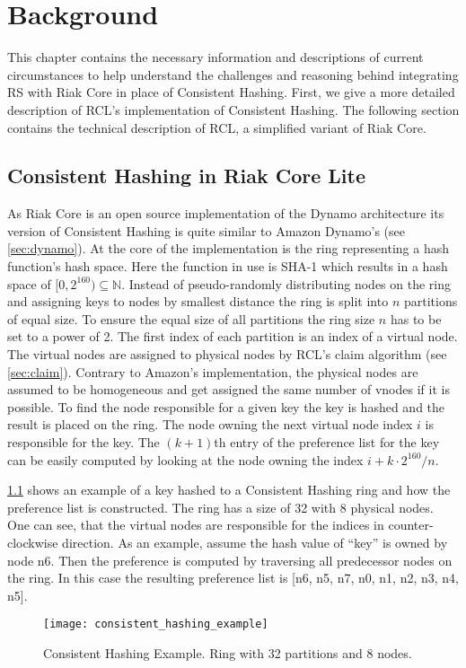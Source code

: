 \chapter{Background}
\label{ch:background}
This chapter contains the necessary information and descriptions of current circumstances to help understand the challenges and reasoning  behind integrating \ac{RS} with Riak Core in place of Consistent Hashing.
First, we give a more detailed description of \ac{RCL}'s implementation of Consistent Hashing.
The following section contains the technical description of \ac{RCL}, a simplified variant of Riak Core.

\section{Consistent Hashing in Riak Core Lite}
\label{sec:riak_core_consistent_hashing}
As Riak Core is an open source implementation of the Dynamo architecture\cite{DeCandia2007} its version of Consistent Hashing is quite similar to Amazon Dynamo's (see \cref{sec:dynamo}).
At the core of the implementation is the ring representing a hash function's hash space.
Here the function in use is SHA-1\cite{Eastlake2001} which results in a hash space of $[0, 2^{160})\subseteq\mathbb{N}$.
Instead of pseudo-randomly distributing nodes on the ring and assigning keys to nodes by smallest distance the ring is split into $n$ partitions of equal size.
To ensure the equal size of all partitions the ring size $n$ has to be set to a power of 2.
The first index of each partition is an index of a virtual node.
The virtual nodes are assigned to physical nodes by \ac{RCL}'s claim algorithm (see \cref{sec:claim}).
Contrary to Amazon's implementation, the physical nodes are assumed to be homogeneous and get assigned the same number of vnodes if it is possible.
To find the node responsible for a given key the key is hashed and the result is placed on the ring.
The node owning the next virtual node index $i$ is responsible for the key.
The $(k+1)$th entry of the preference list for the key can be easily computed by looking at the node owning the index $i + k\cdot2^{160}/n$.

\cref{fig:chash_example} shows an example of a key hashed to a Consistent Hashing ring and how the preference list is constructed.
The ring has a size of 32 with 8 physical nodes.
One can see, that the virtual nodes are responsible for the indices in counter-clockwise direction.
As an example, assume the hash value of ``key'' is owned by node n6.
Then the preference is computed by traversing all predecessor nodes on the ring.
In this case the resulting preference list is [n6, n5, n7, n0, n1, n2, n3, n4, n5].
\begin{figure}
\texttt{[image: consistent\_hashing\_example]}
\caption[Consistent Hashing Example]{Consistent Hashing Example.
	Ring with 32 partitions and 8 nodes.}
\label{fig:chash_example}
\end{figure}


